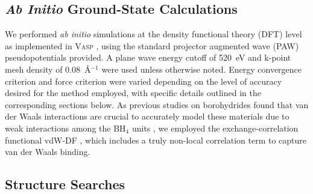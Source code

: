 \documentclass[twocolumn, prb, showpacs]{revtex4-1}
\begin{document}
\subsection{\emph{Ab Initio} Ground-State Calculations}

We performed {\it ab initio} simulations at the 
density functional theory (DFT) level as implemented in \textsc{Vasp}
\cite{Kresse_1996:efficient_iterative, Kresse_1999:ultrasoft_pseudopotentials},
using the standard projector augmented wave (PAW) pseudopotentials provided. A plane wave energy cutoff
of 520~eV and k-point mesh density of
0.08~\AA$^{-1}$ were used unless otherwise noted. Energy convergence
criterion and force criterion were varied depending on the level of accuracy desired
for the method employed, with specific details outlined in the corresponding sections below.
As previous studies on borohydrides found that van der Waals interactions are
crucial to accurately model these materials due to weak interactions among the
BH$_4$ units \cite{Miwa_2007:first-principles_study,
Lodziana_2010:multivalent_metal, Bil_2011:van_waals}, we employed the exchange-correlation functional vdW-DF
\cite{Thonhauser_2015:spin_signature, Berland_2015:van_waals,
Thonhauser_2007:van_waals, Langreth_2009:density_functional}, which includes a
truly non-local correlation term to capture van der Waals binding.









\subsection{Structure Searches}
\end{document}
